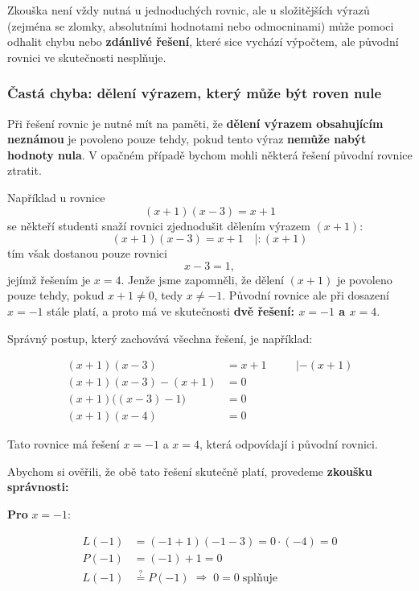 \documentclass[12pt,a4paper]{article}
\begin{document}
\medskip
Zkouška není vždy nutná u jednoduchých rovnic, ale u složitějších výrazů
(zejména se zlomky, absolutními hodnotami nebo odmocninami) 
může pomoci odhalit chybu nebo \textbf{zdánlivé řešení}, 
které sice vychází výpočtem, ale původní rovnici ve skutečnosti nesplňuje.





\subsubsection*{Častá chyba: dělení výrazem, který může být roven nule}

Při řešení rovnic je nutné mít na paměti, že \textbf{dělení výrazem obsahujícím neznámou}
je povoleno pouze tehdy, pokud tento výraz \textbf{nemůže nabýt hodnoty nula}.  
V opačném případě bychom mohli některá řešení původní rovnice ztratit.

\medskip
Například u rovnice
\[
(x + 1)(x - 3) = x + 1
\]
se někteří studenti snaží rovnici zjednodušit dělením výrazem $(x + 1)$:
\[
(x + 1)(x - 3) = x + 1 \quad | : (x + 1)
\]
tím však dostanou pouze rovnici
\[
x - 3 = 1,
\]
jejímž řešením je $x = 4$.  
Jenže jsme zapomněli, že dělení $(x + 1)$ je povoleno pouze tehdy, pokud $x + 1 \neq 0$, tedy $x \neq -1$.  
Původní rovnice ale při dosazení $x = -1$ stále platí, a proto má ve skutečnosti \textbf{dvě řešení: $x = -1$ a $x = 4$}.  

\medskip
Správný postup, který zachovává všechna řešení, je například:

\begin{align*}
(x + 1)(x - 3) &= x + 1 &&\quad | - (x + 1)\\
(x + 1)(x - 3) - (x + 1) &= 0\\
(x + 1)\bigl((x - 3) - 1\bigr) &= 0\\
(x + 1)(x - 4) &= 0
\end{align*}

Tato rovnice má řešení $x = -1$ a $x = 4$, která odpovídají i původní rovnici.

\medskip
Abychom si ověřili, že obě tato řešení skutečně platí, provedeme \textbf{zkoušku správnosti:}

\textbf{Pro } $x = -1$:

\begin{align*}
L(-1) &= (-1 + 1)(-1 - 3) = 0 \cdot (-4) = 0\\
P(-1) &= (-1) + 1 = 0\\
L(-1) &\stackrel{?}{=} P(-1) \;\Rightarrow\; 0 = 0 \;\text{splňuje}
\end{align*}
\end{document}
